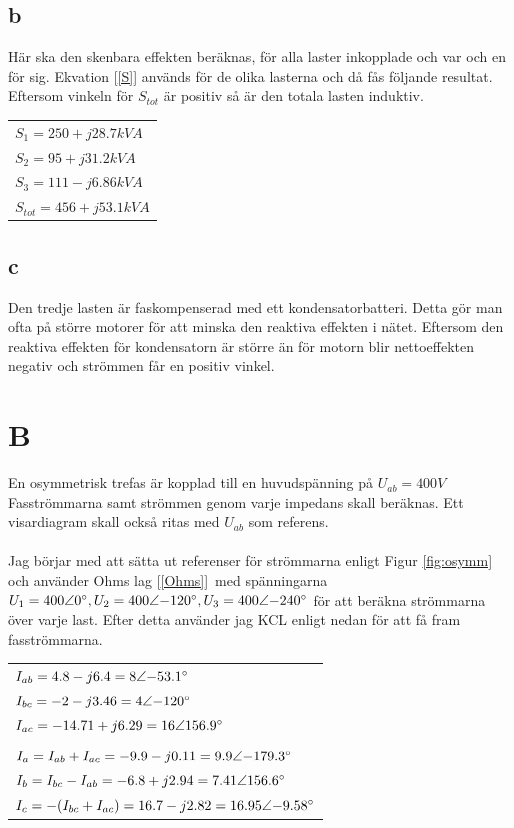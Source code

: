 \documentclass{article}
\begin{document}
\subsection{b}
  Här ska den skenbara effekten beräknas, för alla laster inkopplade och var och en för sig.
  Ekvation [\ref{S}] används för de olika lasterna och då fås följande resultat.
  Eftersom vinkeln för $S_{tot}$ är positiv så är den totala lasten induktiv.

  \begin{tabular}{l}
      $S_1=250 + j28.7 kVA$ \\
      $S_2=95+ j31.2 kVA$ \\
      $S_3 = 111 -  j6.86 kVA$\\
      $S_{tot}=456 + j53.1 kVA$
  \end{tabular}

\subsection{c}
Den tredje lasten är faskompenserad med ett kondensatorbatteri.
Detta gör man ofta på större motorer för att minska den reaktiva effekten i nätet.
Eftersom den reaktiva effekten för kondensatorn är större än för motorn blir nettoeffekten negativ och strömmen får en positiv vinkel.


\section{B}
  En osymmetrisk trefas är kopplad till en huvudspänning på $U_{ab}=400V$
  Fasströmmarna samt strömmen genom varje impedans skall beräknas.
  Ett visardiagram skall också ritas med $U_{ab}$ som referens.
  \\
  \\
  Jag börjar med att sätta ut referenser för strömmarna enligt Figur \ref{fig:osymm} och använder Ohms lag [\ref{Ohms}]\
   med spänningarna $U_1=400\angle{0\degree},U_2=400\angle{-120\degree},U_3=400\angle{-240\degree}$ för att beräkna strömmarna över varje last.
  Efter detta använder jag KCL enligt nedan för att få fram fasströmmarna.


  \begin{tabular}{| l}
    $I_{ab}=4.8-j6.4=8\angle{-53.1\degree}$\\
    $I_{bc}=-2-j3.46=4\angle{-120\degree}$\\
    $I_{ac}=-14.71+j6.29=16\angle{156.9\degree}$\\
    \\
    $I_a=I_{ab}+I_{ac}=-9.9-j0.11=9.9\angle{-179.3\degree}$\\
    $I_b=I_{bc}-I_{ab}=-6.8+j2.94=7.41\angle{156.6\degree}$\\
    $I_c=-(I_{bc}+I_{ac})=16.7-j2.82=16.95\angle{-9.58\degree}$\\
  \end{tabular}
\end{document}

